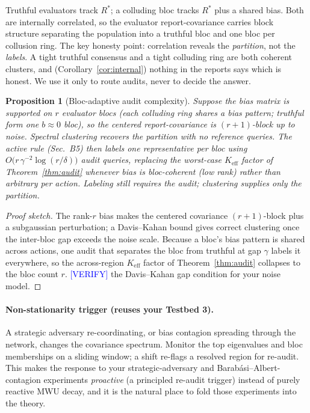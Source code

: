 \documentclass[11pt]{article}
\newtheorem{proposition}{Proposition}
\theoremstyle{definition}
\theoremstyle{remark}
\newcommand{\Rstar}{R^{\ast}}
\begin{document}
Truthful evaluators track $\Rstar$; a colluding bloc tracks $\Rstar$ plus a shared bias. Both are
internally correlated, so the evaluator report-covariance carries block structure separating the
population into a truthful bloc and one bloc per collusion ring. The key honesty point:
correlation reveals the \emph{partition}, not the \emph{labels}. A tight truthful consensus and a
tight colluding ring are both coherent clusters, and (Corollary~\ref{cor:internal}) nothing in the
reports says which is honest. We use it only to route audits, never to decide the answer.

\begin{proposition}[Bloc-adaptive audit complexity]
\label{prop:bloc}
Suppose the bias matrix is supported on $r$ evaluator blocs (each colluding ring shares a bias
pattern; truthful form one $b\!\approx\!0$ bloc), so the centered report-covariance is
$(r{+}1)$-block up to noise. Spectral clustering recovers the partition with no reference queries.
The active rule (Sec.~B5) then labels one representative per bloc using
$O\!\big(r\,\gamma^{-2}\log(r/\delta)\big)$ audit queries, replacing the worst-case
$K_{\mathrm{eff}}$ factor of Theorem~\ref{thm:audit} whenever bias is bloc-coherent (low rank)
rather than arbitrary per action. Labeling still requires the audit; clustering supplies only the
partition.
\end{proposition}

\begin{proof}[Proof sketch]
The rank-$r$ bias makes the centered covariance $(r{+}1)$-block plus a subgaussian perturbation; a
Davis--Kahan bound gives correct clustering once the inter-bloc gap exceeds the noise scale. Because
a bloc's bias pattern is shared across actions, one audit that separates the bloc from truthful at
gap $\gamma$ labels it everywhere, so the across-region $K_{\mathrm{eff}}$ factor of
Theorem~\ref{thm:audit} collapses to the bloc count $r$. \textcolor{blue}{[VERIFY]} the
Davis--Kahan gap condition for your noise model.
\end{proof}

\paragraph{Non-stationarity trigger (reuses your Testbed 3).}
A strategic adversary re-coordinating, or bias contagion spreading through the network, changes the
covariance spectrum. Monitor the top eigenvalues and bloc memberships on a sliding window; a shift
re-flags a resolved region for re-audit. This makes the response to your strategic-adversary and
Barab\'asi--Albert-contagion experiments \emph{proactive} (a principled re-audit trigger) instead
of purely reactive MWU decay, and it is the natural place to fold those experiments into the theory.
\end{document}
